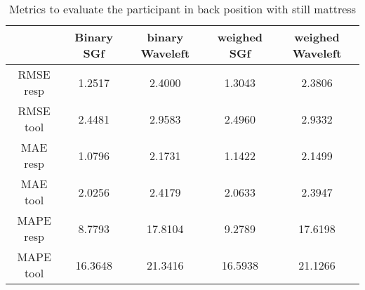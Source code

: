 \begin{table}[h]
\centering
\begin{tabular}{|c|c|c|c|c|}
\hline 
& Binary SGf & binary Waveleft & weighed  SGf & weighed Waveleft \\ 
\hline 
RMSE resp & 
    1.2517  &  2.4000  &  1.3043  &  2.3806 \\ 
RMSE tool &      2.4481  &  2.9583   & 2.4960  &  2.9332 \\ 
MAE resp & 1.0796 &   2.1731 &     1.1422 &  2.1499 \\ 
MAE tool &     2.0256 & 2.4179 & 2.0633 &  2.3947 \\ 
MAPE resp & 8.7793 & 17.8104 & 9.2789 & 17.6198 \\ 
MAPE tool & 16.3648 & 21.3416 & 16.5938 & 21.1266 \\ 
\hline 
\end{tabular}

\caption{Metrics to evaluate the participant in back position with still mattress}
\end{table}

